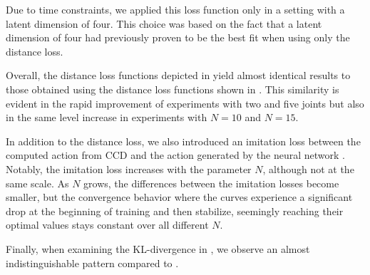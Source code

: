 Due to time constraints, we applied this loss function only in a setting with a latent dimension of four. This choice was based on the fact that a latent dimension of four had previously proven to be the best fit when using only the distance loss.

Overall, the distance loss functions depicted in  yield almost identical results to those obtained using the distance loss functions shown in . This similarity is evident in the rapid improvement of experiments with two and five joints but also in the same level increase in experiments with $N=10$ and $N=15$.

In addition to the distance loss, we also introduced an imitation loss between the computed action from CCD and the action generated by the neural network . Notably, the imitation loss increases with the parameter $N$, although not at the same scale. As $N$ grows, the differences between the imitation losses become smaller, but the convergence behavior where the curves experience a significant drop at the beginning of training and then stabilize, seemingly reaching their optimal values stays constant over all different $N$.

Finally, when examining the KL-divergence in , we observe an almost indistinguishable pattern compared to .

